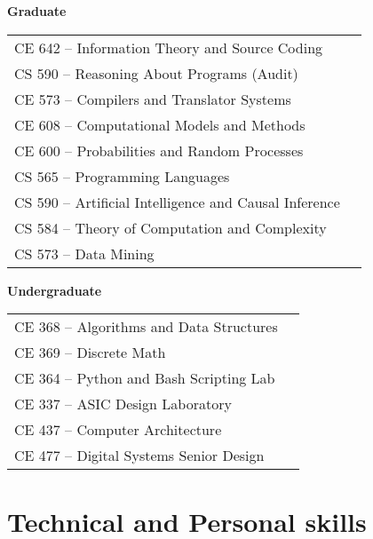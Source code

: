 \documentclass[10pt,a4paper,sans]{moderncv}        %
\begin{document}
\begin{minipage}[t]{0.45\linewidth}
  \raggedright
  \textbf{Graduate}
  \begin{tabular}{ll}
    CE 642 -- Information Theory and Source Coding \\
    CS 590 -- Reasoning About Programs (Audit) \\
    CE 573 -- Compilers and Translator Systems \\
    CE 608 -- Computational Models and Methods \\
    CE 600 -- Probabilities and Random Processes \\
    CS 565 -- Programming Languages \\
    CS 590 -- Artificial Intelligence and Causal Inference \\
    CS 584 -- Theory of Computation and Complexity \\
    CS 573 -- Data Mining \\
  \end{tabular}
\end{minipage}
\hfill
\begin{minipage}[t]{0.45\linewidth}
  \raggedright
  \textbf{Undergraduate}
  \begin{tabular}{ll}
    CE 368 -- Algorithms and Data Structures \\
    CE 369 -- Discrete Math \\
    CE 364 -- Python and Bash Scripting Lab \\
    CE 337 -- ASIC Design Laboratory \\
    CE 437 -- Computer Architecture \\
    CE 477 -- Digital Systems Senior Design \\
  \end{tabular}
\end{minipage}

\section{Technical and Personal skills}

\vspace{4pt}
\end{document}
